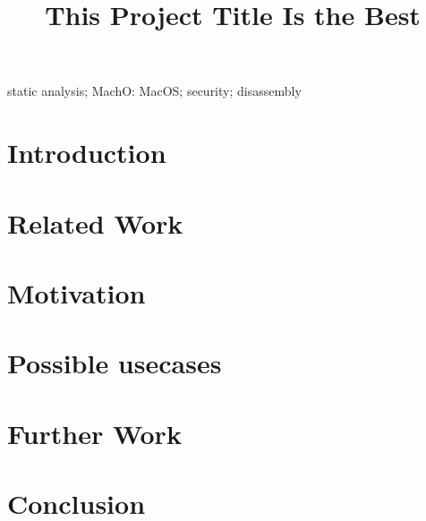\documentclass[10pt, conference, compsocconf]{IEEEtran}
\begin{document}
\title{This Project Title Is the Best}

\author{
}

\maketitle


\begin{abstract}
  
\end{abstract}

\begin{IEEEkeywords}
static analysis; MachO: MacOS; security; disassembly
\end{IEEEkeywords}

\IEEEpeerreviewmaketitle

\section{Introduction}
\label{sec:intro}


\section{Related Work}
\label{sec:related}


\section{Motivation}
\label{sec:motivation}


\section{Possible usecases}
\label{sec:usecases}


\section{Further Work}
\label{sec:further}


\section{Conclusion}
\label{sec:conclusion}




\end{document}
